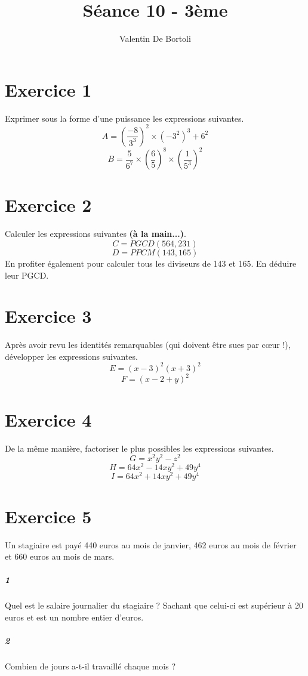 \documentclass[10pt,a4paper]{article}
\title{Séance 10 - 3ème}
\author{Valentin De Bortoli}
\begin{document}
\maketitle
\section{Exercice 1}
Exprimer sous la forme d'une puissance les expressions suivantes.
\begin{equation}
A=\left( \frac{-8}{3^3}\right)^2 \times (-3^2)^3 +6^2
\end{equation}
\begin{equation}
B=\frac{5}{6^7}\times \left( \frac{6}{5} \right)^8 \times\left( \frac{1}{5^3} \right)^2
\end{equation}
\section{Exercice 2}
Calculer les expressions suivantes \textbf{(à la main...)}.
\begin{equation}
C=PGCD(564,231)
\end{equation}
\begin{equation}
D=PPCM(143,165)
\end{equation}
En profiter également pour calculer tous les diviseurs de 143 et 165. En déduire leur PGCD.
\section{Exercice 3}
Après avoir revu les identités remarquables (qui doivent être sues par cœur !), développer les expressions suivantes.
\begin{equation}
E=(x-3)^2(x+3)^2
\end{equation}
\begin{equation}
F=(x-2+y)^2
\end{equation}
\section{Exercice 4}
De la même manière, factoriser le plus possibles les expressions suivantes.
\begin{equation}
G=x^2y^2-z^2
\end{equation}
\begin{equation}
H=64x^2-14xy^2+49y^4
\end{equation}
\begin{equation}
I=64x^2+14xy^2+49y^4
\end{equation}
\section{Exercice 5}
Un stagiaire est payé 440 euros au mois de janvier, 462 euros au mois de février et 660 euros au mois de mars.
\subparagraph{1}Quel est le salaire journalier du stagiaire ? Sachant que celui-ci est supérieur à 20 euros et est un nombre entier d'euros.
\subparagraph{2}Combien de jours a-t-il travaillé chaque mois ?
\end{document}
